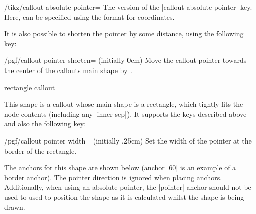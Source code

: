 \begin{key}{/tikz/callout absolute pointer=}
	The \tikzname{} version of the |callout absolute pointer| key. Here,
	 can be specified using the \tikzname{} format for
	coordinates.
\end{key}

	It is also possible to shorten the pointer by some distance, using
	the following key:
	
\begin{key}{/pgf/callout pointer shorten= (initially 0cm)}
	Move the callout pointer towards the center of the callouts main
	shape by .
	
\begin{codeexample}[]
\end{codeexample}
\end{key}
	

\begin{shape}{rectangle callout}%
	
  This shape is a callout whose main shape is a rectangle, which
  tightly fits the node contents (including any |inner sep|).
  It  supports the keys described above and also the following
  key:


\begin{key}{/pgf/callout pointer width= (initially .25cm)}
  Set the width of the pointer at the border of the rectangle.
\end{key}
		
	The anchors for this shape are shown below (anchor |60| is an
	example of a border anchor). The pointer direction is ignored when
	placing anchors.
	Additionally, when using an absolute pointer, the |pointer|
	anchor should not be used to used to position the shape as it is
	calculated whilst the shape is being drawn.
	
\begin{codeexample}[]
\Huge
{}
\end{codeexample}

\end{shape}%


